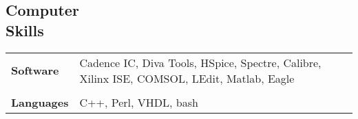 \documentclass[margin]{res}
\begin{document}
\begin{resume}
\section{Computer \\ Skills}
   \begin{tabular}{l p{3.5in}}
     	{\bf Software} &  Cadence IC, Diva Tools, HSpice, Spectre, Calibre, Xilinx ISE, COMSOL, LEdit, Matlab, Eagle \\\\
	{\bf Languages} & C++, Perl, VHDL, bash
 \end{tabular}

\end{resume} 
\end{document}

